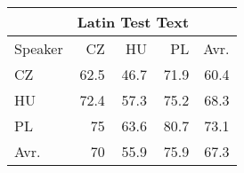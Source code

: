 \begin{tabular}{l|rrr|r}
\hline
 & \multicolumn{3}{c}{Latin Test Text} & \\
\hline
 Speaker   &   CZ &   HU &   PL &   Avr. \\
\hline
 CZ        & 62.5 & 46.7 & 71.9 &   60.4 \\
 HU        & 72.4 & 57.3 & 75.2 &   68.3 \\
 PL        & 75   & 63.6 & 80.7 &   73.1 \\
\hline
 Avr.     & 70   & 55.9 & 75.9 &   67.3 \\
\hline
\end{tabular}